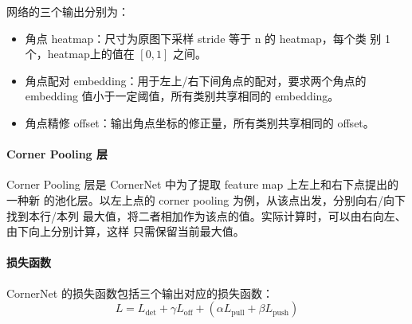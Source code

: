 网络的三个输出分别为：

\begin{itemize}
  \item 角点 heatmap：尺寸为原图下采样 stride 等于 n 的 heatmap，每个类
    别 1 个，heatmap上的值在 $[0, 1]$ 之间。
  \item 角点配对 embedding：用于左上/右下间角点的配对，要求两个角点的 embedding
    值小于一定阈值，所有类别共享相同的 embedding。
  \item 角点精修 offset：输出角点坐标的修正量，所有类别共享相同的 offset。
\end{itemize}

\paragraph{Corner Pooling 层}
Corner Pooling 层是 CornerNet 中为了提取 feature map 上左上和右下点提出的一种新
的池化层。以左上点的 corner pooling 为例，从该点出发，分别向右/向下找到本行/本列
最大值，将二者相加作为该点的值。实际计算时，可以由右向左、由下向上分别计算，这样
只需保留当前最大值。

\paragraph{损失函数}
CornerNet 的损失函数包括三个输出对应的损失函数：
\begin{equation}
  \label{eq:cornernet-loss}
  L = L_{\mathrm{det}} + \gamma L_{\mathrm{off}} + (\alpha L_{\mathrm{pull}} + \beta L_{\mathrm{push}})
\end{equation}

